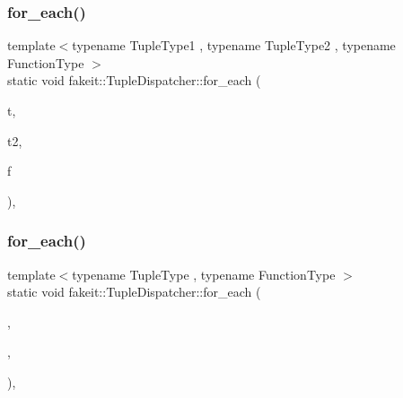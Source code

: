 \mbox{\label{structfakeit_1_1TupleDispatcher_a1ddb90f24aa73dd61bf2b95c5f176cd5}} 
\subsubsection{\texorpdfstring{for\_each()}{for\_each()}\hspace{0.1cm}{\footnotesize\ttfamily [6/54]}}
{\footnotesize\ttfamily template$<$typename Tuple\+Type1 , typename Tuple\+Type2 , typename Function\+Type $>$ \\
static void fakeit\+::\+Tuple\+Dispatcher\+::for\+\_\+each (\begin{DoxyParamCaption}\item[{Tuple\+Type1 \&\&}]{t,  }\item[{Tuple\+Type2 \&\&}]{t2,  }\item[{Function\+Type \&}]{f }\end{DoxyParamCaption})\hspace{0.3cm}{\ttfamily [inline]}, {\ttfamily [static]}}

\mbox{\label{structfakeit_1_1TupleDispatcher_af22c1fae8c695f722da986df9af411ca}} 
\subsubsection{\texorpdfstring{for\_each()}{for\_each()}\hspace{0.1cm}{\footnotesize\ttfamily [7/54]}}
{\footnotesize\ttfamily template$<$typename Tuple\+Type , typename Function\+Type $>$ \\
static void fakeit\+::\+Tuple\+Dispatcher\+::for\+\_\+each (\begin{DoxyParamCaption}\item[{Tuple\+Type \&\&}]{,  }\item[{Function\+Type \&}]{,  }\item[{std\+::integral\+\_\+constant$<$ size\+\_\+t, std\+::tuple\+\_\+size$<$ typename std\+::remove\+\_\+reference$<$ Tuple\+Type $>$\+::type $>$\+::value $>$}]{ }\end{DoxyParamCaption})\hspace{0.3cm}{\ttfamily [inline]}, {\ttfamily [static]}}

